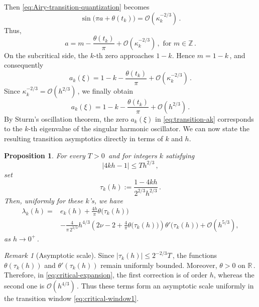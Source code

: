 \documentclass[11pt]{amsart}
\numberwithin{equation}{section}
\newtheorem{proposition}[theorem]{Proposition}
\theoremstyle{remark}
\newtheorem{remark}[theorem]{Remark}
\begin{document}
%
Then \eqref{eq:Airy-transition-quantization} becomes
\[
	\sin\bigl(\pi a+\theta(t_k)\bigr)
	=
	\mathcal O(\kappa_k^{-2/3})\,.
\]
Thus,
\[
	a=m-\frac{\theta(t_k)}{\pi}
	+\mathcal O(\kappa_k^{-2/3})\,,
	\mbox{ for } m\in\mathbb Z\,.
\]
On the subcritical side, the $k$-th zero approaches $1-k$.
Hence $m=1-k\,$, and consequently
\begin{equation}\label{eq:transition-tk}
	a_k(\xi)
	=
	1-k-\frac{\theta(t_k)}{\pi}
	+\mathcal O(\kappa_k^{-2/3})\,.
\end{equation}
Since $\kappa_k^{-2/3}=\mathcal O(h^{2/3})\,$, we finally obtain
\begin{equation}\label{eq:transition-ak}
	a_k(\xi)
	=
	1-k-\frac{\theta(t_k)}{\pi}
	+\mathcal O(h^{2/3})\,.
\end{equation}
By Sturm's oscillation theorem, the zero $a_k(\xi)$ in
\eqref{eq:transition-ak} corresponds to the $k$-th eigenvalue
of the singular harmonic oscillator. We can now state the resulting
transition asymptotics directly in terms of $k$ and $h$.



\begin{proposition}\label{prop:critical}
	For every $T>0\,$ and for integers $k$ satisfying
	\begin{equation}\label{eq:critical-window1}
		|4kh-1|\leq T h^{2/3}\,,
	\end{equation}
	set
	\begin{equation}\label{eq:tau-k}
		\tau_k(h)
		:=
		\frac{1-4kh}{2^{2/3}h^{2/3}}\,.
	\end{equation}
	Then,  uniformly for these $k$'s,  we have
	\begin{equation}\label{eq:critical-expansion}
		\begin{aligned}
			\lambda_k(h)
			={}&
			e_k(h)
			+
			\frac{4h}{\pi}\theta\bigl(\tau_k(h)\bigr)
			\\
			&-
			\frac{4}{\pi\,2^{2/3}}
			h^{4/3}
			\left(
			2\nu-2+\frac{4}{\pi}\theta\bigl(\tau_k(h)\bigr)
			\right)
			\theta'\bigl(\tau_k(h)\bigr)
			+
			\mathcal O(h^{5/3}),
		\end{aligned}
	\end{equation}
	as $h\to0^+\,$. 
\end{proposition}

\begin{remark}[Asymptotic scale]
	Since $|\tau_k(h)|\leq 2^{-2/3}T\,$, the functions $\theta(\tau_k(h))$
	and $\theta'(\tau_k(h))$ remain uniformly bounded. Moreover,
	$\theta>0$ on $\mathbb R\,$.
	Therefore, in \eqref{eq:critical-expansion}, the first correction
	is of order $h$, whereas the second one is
	$\mathcal O(h^{4/3})\,$.
 Thus these terms form an asymptotic scale uniformly in the
	transition window \eqref{eq:critical-window1}.
\end{remark}
\end{document}
